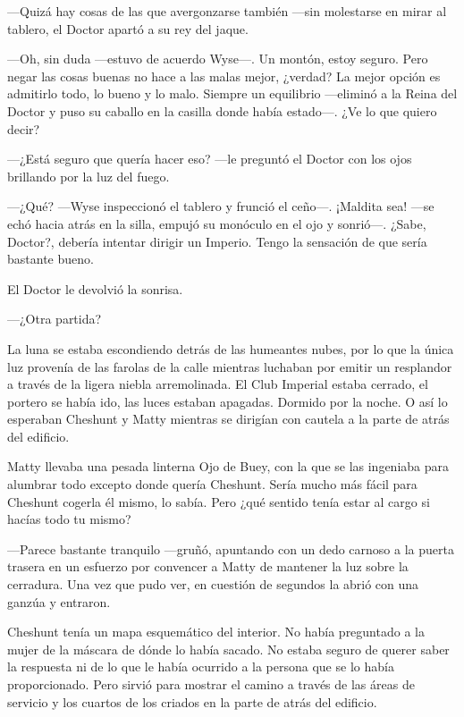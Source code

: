 {---Quizá hay cosas de las que avergonzarse también ---sin molestarse en
mirar al tablero, el Doctor apartó a su rey del jaque.}

{---Oh, sin duda ---estuvo de acuerdo Wyse---. Un montón, estoy seguro.
	Pero negar las cosas buenas no hace a las malas mejor, ¿verdad? La
	mejor opción es admitirlo todo, lo bueno y lo malo. Siempre un
	equilibrio ---eliminó a la Reina del Doctor y puso su caballo en la
casilla donde había estado---. ¿Ve lo que quiero decir?}

{---¿Está seguro que quería hacer eso? ---le preguntó el Doctor con los
ojos brillando por la luz del fuego.}

{---¿Qué? ---Wyse inspeccionó el tablero y frunció el ceño---. ¡Maldita
	sea! ---se echó hacia atrás en la silla, empujó su monóculo en el ojo y
	sonrió---. ¿Sabe, Doctor?, debería intentar dirigir un Imperio. Tengo la
sensación de que sería bastante bueno.}

{El Doctor le devolvió la sonrisa.}

{---¿Otra partida?}

\mbox{}

{La luna se estaba escondiendo detrás de las humeantes nubes, por lo que
	la única luz provenía de las farolas de la calle mientras luchaban por
	emitir un resplandor a través de la ligera niebla arremolinada. El Club
	Imperial estaba cerrado, el portero se había ido, las luces estaban
	apagadas. Dormido por la noche. O así lo esperaban Cheshunt y Matty
mientras se dirigían con cautela a la parte de atrás del edificio.}

{Matty llevaba una pesada linterna Ojo de Buey, con la que se las
	ingeniaba para alumbrar todo excepto donde quería Cheshunt. Sería mucho
	más fácil para Cheshunt cogerla él mismo, lo sabía. Pero ¿qué sentido
tenía estar al cargo si hacías todo tu mismo?}

{---Parece bastante tranquilo ---gruñó, apuntando con un dedo carnoso a
	la puerta trasera en un esfuerzo por convencer a Matty de mantener la
	luz sobre la cerradura. Una vez que pudo ver, en cuestión de segundos la
abrió con una ganzúa y entraron.}

{Cheshunt tenía un mapa esquemático del interior. No había preguntado a
	la mujer de la máscara de dónde lo había sacado. No estaba seguro de
	querer saber la respuesta ni de lo que le había ocurrido a la persona
	que se lo había proporcionado. Pero sirvió para mostrar el camino a
	través de las áreas de servicio y los cuartos de los criados en la parte
de atrás del edificio.}


